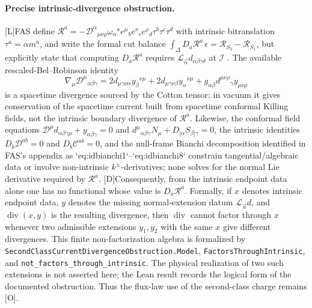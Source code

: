 \documentclass[11pt,a4paper]{article}
\newcommand{\scri}{\mathscr{I}}
\newcommand{\cR}{\mathcal{R}}
\newcommand{\statusL}{\textsf{[L]}}
\newcommand{\statusD}{\textsf{[D]}}
\newcommand{\statusO}{\textsf{[O]}}
\begin{document}
\paragraph{Precise intrinsic-divergence obstruction.}
\statusL FAS define \(\cR^a=-\mathcal D^\alpha{}_{\mu\nu\rho}\omega_\alpha{}^a e^\mu{}_b e^\nu{}_c e^\rho{}_d\tau^b\tau^c\tau^d\) with intrinsic bitranslation \(\tau^a=\alpha m^a\), and write the formal cut balance \(\int_\Delta D_a\cR^a\,\epsilon=\cR_{S_2}-\cR_{S_1}\), but explicitly state that computing \(D_a\cR^a\) requires \(\mathcal L_{\vec n}d_{\alpha\beta\gamma\delta}\) at \(\scri\) \cite{fabSen2022asymptotic}.  The available rescaled-Bel--Robinson identity
\[
  \nabla_\mu\mathcal D^\mu{}_{\alpha\beta\gamma}
  =
  2d_{\mu\gamma\nu\alpha}y_\beta{}^{\nu\mu}
  +
  2d_{\mu\gamma\nu\beta}y_\alpha{}^{\nu\mu}
  +
  g_{\alpha\beta}d^{\mu\nu\rho}{}_\gamma y_{\mu\nu\rho}
\]
is a spacetime divergence sourced by the Cotton tensor; in vacuum it gives conservation of the spacetime current built from spacetime conformal Killing fields, not the intrinsic boundary divergence of \(\cR^a\).  Likewise, the conformal field equations \(\mathcal D^\mu d_{\alpha\beta\gamma\mu}+y_{\alpha\beta\gamma}=0\) and \(d^\mu{}_{\alpha\beta\gamma}N_\mu+D_{[\alpha}S_{\beta]\gamma}=0\), the intrinsic identities \(D_b\mathcal D^{ab}=0\) and \(D_b\mathcal C^{ab}=0\), and the null-frame Bianchi decomposition identified in FAS's appendix as `eq:idbianchi1`--`eq:idbianchi8` constrain tangential/algebraic data or involve non-intrinsic \(k^\pm\)-derivatives; none solves for the normal Lie derivative required by \(\cR^a\).
\statusD Consequently, from the intrinsic endpoint data alone one has no functional whose value is \(D_a\cR^a\).  Formally, if \(x\) denotes intrinsic endpoint data, \(y\) denotes the missing normal-extension datum \(\mathcal L_{\vec n}d\), and \(\operatorname{div}(x,y)\) is the resulting divergence, then \(\operatorname{div}\) cannot factor through \(x\) whenever two admissible extensions \(y_1,y_2\) with the same \(x\) give different divergences.  This finite non-factorization algebra is formalized by \texttt{SecondClassCurrentDivergenceObstruction.Model}, \texttt{FactorsThroughIntrinsic}, and \texttt{not\_factors\_through\_intrinsic}.  The physical realization of two such extensions is not asserted here; the Lean result records the logical form of the documented obstruction.  Thus the flux-law use of the second-class charge remains \statusO.
\end{document}
